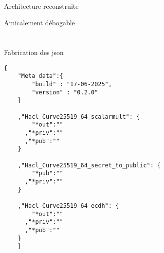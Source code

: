 \documentclass[A4,svgnames,9pt,aspectratio=169]{beamer}
\begin{document}
\begin{frame}{Architecture reconstruite}
  \begin{block}{Amicalement débogable}
    \begin{columns}
      \begin{column}{0.5\textwidth}
        \begin{minipage}[t][4cm][t]{\linewidth}
          \large{
          }
        \end{minipage}
      \end{column}

      \begin{column}{0.5\textwidth}
        \begin{minipage}[t][4cm][t]{\linewidth}
          \large{
          }
        \end{minipage}
      \end{column}
    \end{columns}
  \end{block}
\end{frame}


\begin{frame}[fragile]{Fabrication des json}
  \begin{lstlisting}[style=CStyle, gobble=4, caption={Hacl\_Curve25519\_64.json}]
    {
    "Meta_data":{
        "build" : "17-06-2025",
        "version" : "0.2.0"
    }

    ,"Hacl_Curve25519_64_scalarmult": {
        "*out":""
      ,"*priv":""
      ,"*pub":""
    }

    ,"Hacl_Curve25519_64_secret_to_public": {
        "*pub":""
      ,"*priv":""
    }

    ,"Hacl_Curve25519_64_ecdh": {
        "*out":""
      ,"*priv":""
      ,"*pub":""
    }
    }
  \end{lstlisting}
\end{frame}
\end{document}
